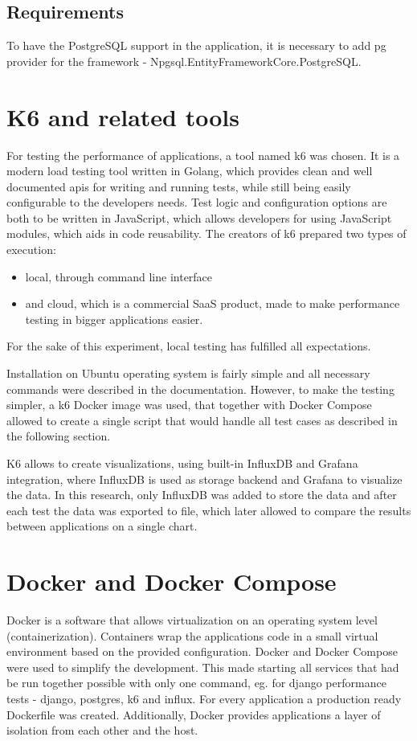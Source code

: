 \subsection{Requirements}

To have the PostgreSQL support in the application, it is necessary to add \acrshort{pg} provider for the framework - Npgsql.EntityFrameworkCore.PostgreSQL.

\section{K6 and related tools}

For testing the performance of applications, a tool named k6 was chosen. It is a modern load testing tool written in Golang, which provides clean and well documented \acrshort{api}s for writing and running tests, while still being easily configurable to the developers needs. Test logic and configuration options are both to be written in JavaScript, which allows developers for using JavaScript modules, which aids in code reusability. The creators of k6 prepared two types of execution:
\begin{itemize}
    \item local, through command line interface
    \item and cloud, which is a commercial SaaS product, made to make performance testing in bigger applications easier.
\end{itemize}
For the sake of this experiment, local testing has fulfilled all expectations.

Installation on Ubuntu operating system is fairly simple and all necessary commands were described in the documentation. However, to make the testing simpler, a k6 Docker image was used, that together with Docker Compose allowed to create a single script that would handle all test cases as described in the following section.

K6 allows to create visualizations, using built-in InfluxDB and Grafana integration, where InfluxDB is used as storage backend and Grafana to visualize the data. In this research, only InfluxDB was added to store the data and after each test the data was exported to file, which later allowed to compare the results between applications on a single chart.

\section{Docker and Docker Compose}

Docker is a software that allows virtualization on an operating system level (containerization). Containers wrap the applications code in a small virtual environment based on the provided configuration. Docker and Docker Compose were used to simplify the development. This made starting all services that had be run together possible with only one command, eg. for django performance tests - django, postgres, k6 and influx. For every application a production ready Dockerfile was created. Additionally, Docker provides applications a layer of isolation from each other and the host.

